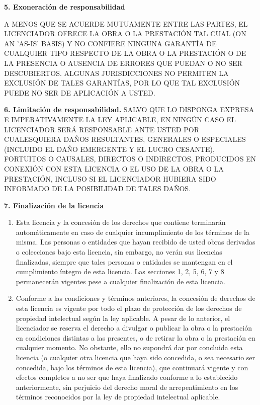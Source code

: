         \par \textbf{5. Exoneración de responsabilidad} \\

        \par A MENOS QUE SE ACUERDE MUTUAMENTE ENTRE LAS PARTES, EL LICENCIADOR OFRECE LA OBRA O LA PRESTACIÓN TAL CUAL (ON AN 'AS-IS' BASIS) Y NO CONFIERE NINGUNA GARANTÍA DE CUALQUIER TIPO RESPECTO DE LA OBRA O LA PRESTACIÓN O DE LA PRESENCIA O AUSENCIA DE ERRORES QUE PUEDAN O NO SER DESCUBIERTOS. ALGUNAS JURISDICCIONES NO PERMITEN LA EXCLUSIÓN DE TALES GARANTÍAS, POR LO QUE TAL EXCLUSIÓN PUEDE NO SER DE APLICACIÓN A USTED. \\

        \par \textbf{6. Limitación de responsabilidad.} SALVO QUE LO DISPONGA EXPRESA E IMPERATIVAMENTE LA LEY APLICABLE, EN NINGÚN CASO EL LICENCIADOR SERÁ RESPONSABLE ANTE USTED POR CUALESQUIERA DAÑOS RESULTANTES, GENERALES O ESPECIALES (INCLUIDO EL DAÑO EMERGENTE Y EL LUCRO CESANTE), FORTUITOS O CAUSALES, DIRECTOS O INDIRECTOS, PRODUCIDOS EN CONEXIÓN CON ESTA LICENCIA O EL USO DE LA OBRA O LA PRESTACIÓN, INCLUSO SI EL LICENCIADOR HUBIERA SIDO INFORMADO DE LA POSIBILIDAD DE TALES DAÑOS. \\


        \par \textbf{7. Finalización de la licencia} 

        \begin{enumerate}
          \item Esta licencia y la concesión de los derechos que contiene terminarán automáticamente en caso de cualquier incumplimiento de los términos de la misma. Las personas o entidades que hayan recibido de usted obras derivadas o colecciones bajo esta licencia, sin embargo, no verán sus licencias finalizadas, siempre que tales personas o entidades se mantengan en el cumplimiento íntegro de esta licencia. Las secciones 1, 2, 5, 6, 7 y 8 permanecerán vigentes pese a cualquier finalización de esta licencia.

          \item Conforme a las condiciones y términos anteriores, la concesión de derechos de esta licencia es vigente por todo el plazo de protección de los derechos de propiedad intelectual según la ley aplicable. A pesar de lo anterior, el licenciador se reserva el derecho a divulgar o publicar la obra o la prestación en condiciones distintas a las presentes, o de retirar la obra o la prestación en cualquier momento. No obstante, ello no supondrá dar por concluida esta licencia (o cualquier otra licencia que haya sido concedida, o sea necesario ser concedida, bajo los términos de esta licencia), que continuará vigente y con efectos completos a no ser que haya finalizado conforme a lo establecido anteriormente, sin perjuicio del derecho moral de arrepentimiento en los términos reconocidos por la ley de propiedad intelectual aplicable.
        \end{enumerate}

